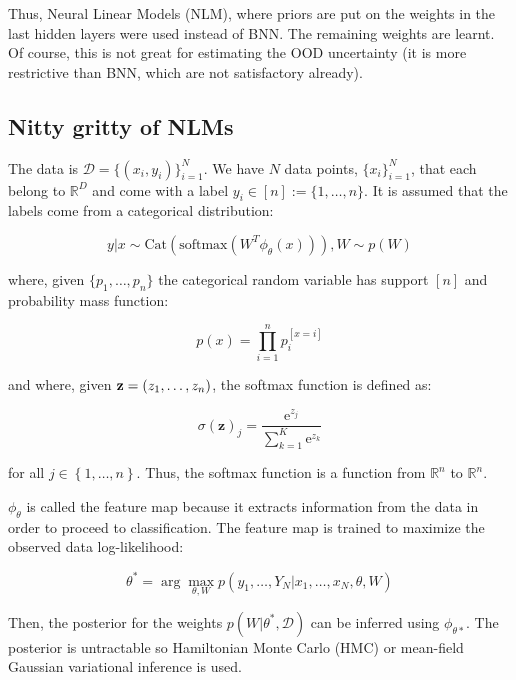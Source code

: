 \documentclass{article}
\theoremstyle{definition}
\theoremstyle{definition}
\theoremstyle{remark}
\begin{document}
Thus, Neural Linear Models (NLM), where priors are put on the weights in the last hidden layers were used instead of BNN. The remaining weights are learnt. Of course, this is not great for estimating the OOD uncertainty (it is more restrictive than BNN, which are not satisfactory already).

\subsection{Nitty gritty of NLMs}

The data is $\mathcal{D}=\{(x_i,y_i)\}_{i=1}^{N}$. We have $N$ data points, $\{x_i\}_{i=1}^{N}$, that each belong to $\mathbb{R}^D$ and come with a label $y_i\in [n]:=\{1,\dots,n\}$. It is assumed that the labels come from a categorical distribution:

\begin{equation} y|x \sim \text{Cat}(\text{softmax}(W^T\phi_\theta(x))), W \sim p(W) \end{equation}

where, given $\{p_1, \dots, p_n\}$ the categorical random variable has support $[n]$ and probability mass function:

\begin{equation} p(x)=\prod_{i=1}^n p_i^{[x=i]} \end{equation}

and where, given $\bold{z}=(z_1,\dots, z_n)$, the softmax function is defined as:

\begin{equation} \sigma (\mathbf {z} )_{j}={\frac {\mathrm {e} ^{z_{j}}}{\sum _{k=1}^{K}\mathrm {e} ^{z_{k}}}} \end{equation} 

for all $ j \in \left\{1,\ldots ,n\right\}$. Thus, the softmax function is a function from $\mathbb{R}^n$ to $\mathbb{R}^n$.

$\phi_\theta$ is called the feature map because it extracts information from the data in order to proceed to classification. The feature map is trained to maximize the observed data log-likelihood:

\begin{equation} \theta^*=\arg \max_{\theta, W} p(y_1,\dots, Y_N|x_1,\dots,x_N,\theta,W) \end{equation}

Then, the posterior for the weights $p(W|\theta^*, \mathcal{D})$ can be inferred using $\phi_{\theta*}$. The posterior is untractable so Hamiltonian Monte Carlo (HMC) or mean-field Gaussian variational inference is used.
\end{document}
